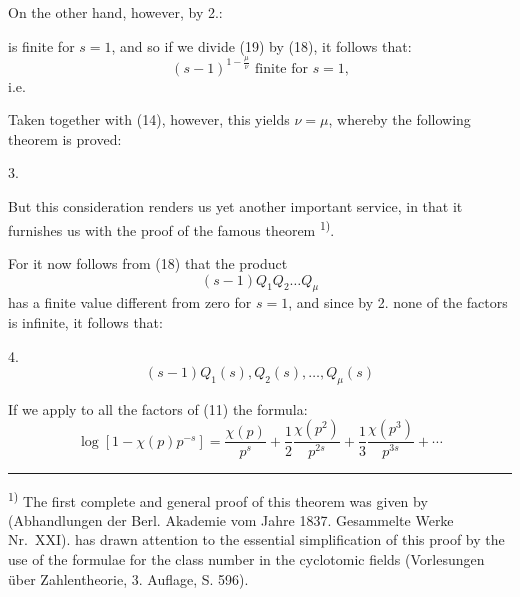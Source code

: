 On the other hand, however, by 2.:


is finite for $s = 1$, and so if we divide (19) by (18), it follows that:
\[
(s-1)^{1-\frac{\mu}{\nu}} \text{ finite for } s = 1 \text{,}
\]
i.e.


Taken together with (14), however, this yields $\nu = \mu$, whereby the following theorem is proved:

3. 

But this consideration renders us yet another important service, in that it furnishes us with the proof of the famous theorem \textsuperscript{1)}.

For it now follows from (18) that the product
\[
(s-1) Q_1 Q_2 \ldots Q_\mu
\]
has a finite value different from zero for $s = 1$, and since by 2. none of the factors is infinite, it follows that:

4. 
\[
(s-1) Q_1(s), Q_2(s), \ldots, Q_\mu(s)
\]

If we apply to all the factors of (11) the formula:
\[
\log \left[1 - \chi(p) p^{-s}\right] = \frac{\chi(p)}{p^s} + \frac{1}{2} \frac{\chi(p^2)}{p^{2s}} + \frac{1}{3} \frac{\chi(p^3)}{p^{3s}} + \cdots %
\]

\noindent\rule{4cm}{0.4pt}

\textsuperscript{1)} The first complete and general proof of this theorem was given by  (Abhandlungen der Berl. Akademie vom Jahre 1837. Gesammelte Werke Nr.\ XXI).  has drawn attention to the essential simplification of this proof by the use of the  formulae for the class number in the cyclotomic fields (Vorlesungen über Zahlentheorie, 3. Auflage, S. 596).
